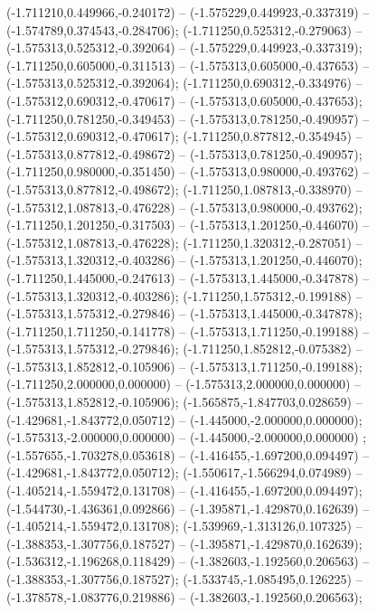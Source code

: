  (-1.711210,0.449966,-0.240172) -- (-1.575229,0.449923,-0.337319) -- (-1.574789,0.374543,-0.284706);
 (-1.711250,0.525312,-0.279063) -- (-1.575313,0.525312,-0.392064) -- (-1.575229,0.449923,-0.337319);
 (-1.711250,0.605000,-0.311513) -- (-1.575313,0.605000,-0.437653) -- (-1.575313,0.525312,-0.392064);
 (-1.711250,0.690312,-0.334976) -- (-1.575312,0.690312,-0.470617) -- (-1.575313,0.605000,-0.437653);
 (-1.711250,0.781250,-0.349453) -- (-1.575313,0.781250,-0.490957) -- (-1.575312,0.690312,-0.470617);
 (-1.711250,0.877812,-0.354945) -- (-1.575313,0.877812,-0.498672) -- (-1.575313,0.781250,-0.490957);
 (-1.711250,0.980000,-0.351450) -- (-1.575313,0.980000,-0.493762) -- (-1.575313,0.877812,-0.498672);
 (-1.711250,1.087813,-0.338970) -- (-1.575312,1.087813,-0.476228) -- (-1.575313,0.980000,-0.493762);
 (-1.711250,1.201250,-0.317503) -- (-1.575313,1.201250,-0.446070) -- (-1.575312,1.087813,-0.476228);
 (-1.711250,1.320312,-0.287051) -- (-1.575313,1.320312,-0.403286) -- (-1.575313,1.201250,-0.446070);
 (-1.711250,1.445000,-0.247613) -- (-1.575313,1.445000,-0.347878) -- (-1.575313,1.320312,-0.403286);
 (-1.711250,1.575312,-0.199188) -- (-1.575313,1.575312,-0.279846) -- (-1.575313,1.445000,-0.347878);
 (-1.711250,1.711250,-0.141778) -- (-1.575313,1.711250,-0.199188) -- (-1.575313,1.575312,-0.279846);
 (-1.711250,1.852812,-0.075382) -- (-1.575313,1.852812,-0.105906) -- (-1.575313,1.711250,-0.199188);
 (-1.711250,2.000000,0.000000) -- (-1.575313,2.000000,0.000000) -- (-1.575313,1.852812,-0.105906);
 (-1.565875,-1.847703,0.028659) -- (-1.429681,-1.843772,0.050712) -- (-1.445000,-2.000000,0.000000);
 (-1.575313,-2.000000,0.000000) -- (-1.445000,-2.000000,0.000000) ;
 (-1.557655,-1.703278,0.053618) -- (-1.416455,-1.697200,0.094497) -- (-1.429681,-1.843772,0.050712);
 (-1.550617,-1.566294,0.074989) -- (-1.405214,-1.559472,0.131708) -- (-1.416455,-1.697200,0.094497);
 (-1.544730,-1.436361,0.092866) -- (-1.395871,-1.429870,0.162639) -- (-1.405214,-1.559472,0.131708);
 (-1.539969,-1.313126,0.107325) -- (-1.388353,-1.307756,0.187527) -- (-1.395871,-1.429870,0.162639);
 (-1.536312,-1.196268,0.118429) -- (-1.382603,-1.192560,0.206563) -- (-1.388353,-1.307756,0.187527);
 (-1.533745,-1.085495,0.126225) -- (-1.378578,-1.083776,0.219886) -- (-1.382603,-1.192560,0.206563);
